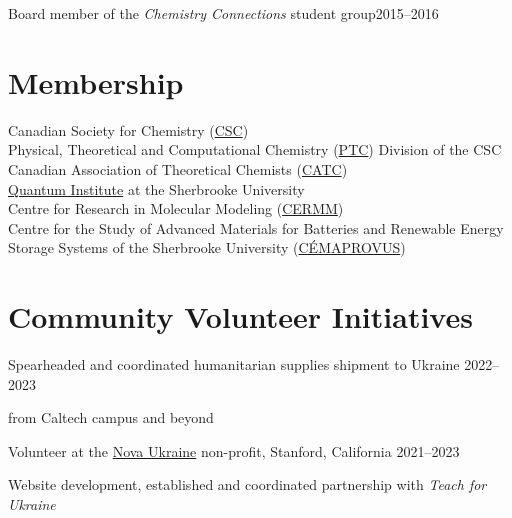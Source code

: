 \documentclass[margin,line]{res}
\newenvironment{list1}{
  \begin{list}{\ding{113}}{%
      \setlength{\itemsep}{0in}
      \setlength{\parsep}{0in} \setlength{\parskip}{0in}
      \setlength{\topsep}{0in} \setlength{\partopsep}{0in} 
      \setlength{\leftmargin}{0.17in}}}{\end{list}}
\begin{document}
\begin{resume}
\vspace*{-1mm}

Board member of the {\em Chemistry Connections} student group\hfill {2015--2016}

\section{\sc Membership}

Canadian Society for Chemistry (\href{https://www.cheminst.ca/about/about-csc/}{CSC})\\
Physical, Theoretical and Computational Chemistry (\href{https://www.cheminst.ca/physical-theoretical-and-computational-division-ptc/}{PTC}) Division of the CSC\\
Canadian Association of Theoretical Chemists (\href{http://www.catc.ca/members}{CATC})\\
\href{https://www.usherbrooke.ca/iq/en/about/team/researchers/roman-korol}{Quantum Institute} at the Sherbrooke University\\
Centre for Research in Molecular Modeling (\href{https://www.concordia.ca/research/molecular-modeling.html}{CERMM})\\
Centre for the Study of Advanced Materials for Batteries and Renewable Energy Storage Systems of the Sherbrooke University (\href{https://www.usherbrooke.ca/recherche/fr/udes/regroupements/centres}{CÉMAPROVUS})

\section{\sc Community Volunteer Initiatives}
Spearheaded and coordinated humanitarian supplies shipment to Ukraine \href{https://www.caltech.edu/about/news/organizing-aid-to-his-native-ukraine}{}\hfill{2022--2023}

\begin{list1}
\item[]from Caltech campus and beyond
\end{list1}

\vspace*{-1mm}

Volunteer at the \href{https://novaukraine.org/}{Nova Ukraine} non-profit, Stanford, California \hfill{2021--2023}

\begin{list1}
\item[]Website development, established and coordinated partnership with {\em Teach for Ukraine}
\end{list1}


\end{resume}
\end{document}
